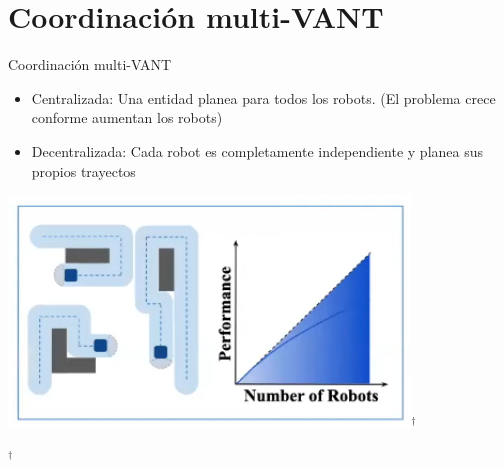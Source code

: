 \documentclass[
  24pt, %
  aspectratio=169, %
]{beamer}
\begin{document}
    
\section{Coordinación multi-VANT}
\begin{frame}{Coordinación multi-VANT}
  \begin{minipage}{0.47\textwidth}

    \begin{itemize}
    \item Centralizada: Una entidad planea para todos los robots. (El problema crece conforme aumentan los robots)
    \item Decentralizada: Cada robot es completamente independiente y planea sus propios trayectos
    \end{itemize}
  \end{minipage}
  \hspace{0.2cm}
  \begin{minipage}{0.5\textwidth}
    \includegraphics[width=0.8\textwidth]{coordination}$^\dag$\\
      \rule{0in}{1.2em}$^\dag$\scriptsize \cite{amanda}
      
  \end{minipage}
\end{frame}
\end{document}
